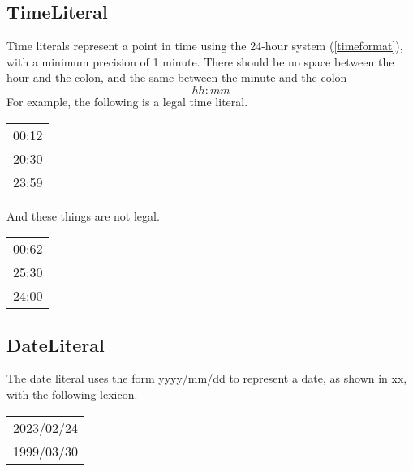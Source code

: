 \subsection{TimeLiteral}\label{TimeLiteral}
Time literals represent a point in time using the 24-hour system (\ref{timeformat}), with a minimum precision of 1 minute.
There should be no space between the hour and the colon, and the same between the minute and the colon
\begin{equation}\label{timeformat}
    hh:mm
\end{equation}
For example, the following is a legal time literal.

\begin{center}
    \begin{tabular}{c}
        00:12 \\
        20:30 \\
        23:59 \\
    \end{tabular}
\end{center}
And these things are not legal.

\begin{center}
    \begin{tabular}{c}
        00:62 \\
        25:30 \\
        24:00 \\
    \end{tabular}
\end{center}
\begin{grammar}
\end{grammar}

\subsection{DateLiteral}\label{DateLiteral}
The date literal uses the form yyyy/mm/dd to represent a date, as shown in xx, with the following lexicon.
\begin{center}
    \begin{tabular}{c}
        2023/02/24 \\
        1999/03/30
    \end{tabular}
\end{center}

\begin{grammar}
\end{grammar}

